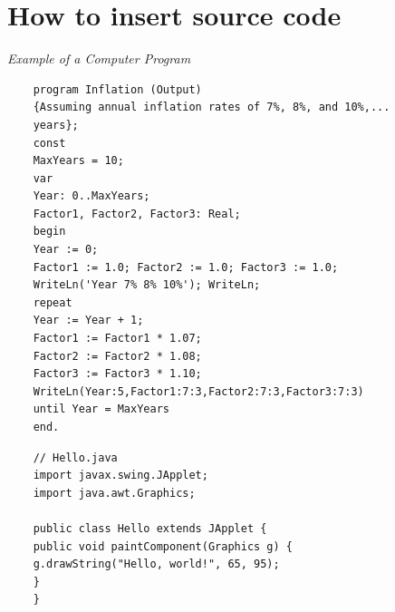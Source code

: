 \chapter{How to insert source code}

\noindent
{\it Example of a Computer Program}
\begin{verbatim}
    program Inflation (Output)
    {Assuming annual inflation rates of 7%, 8%, and 10%,...
    years};
    const
    MaxYears = 10;
    var
    Year: 0..MaxYears;
    Factor1, Factor2, Factor3: Real;
    begin
    Year := 0;
    Factor1 := 1.0; Factor2 := 1.0; Factor3 := 1.0;
    WriteLn('Year 7% 8% 10%'); WriteLn;
    repeat
    Year := Year + 1;
    Factor1 := Factor1 * 1.07;
    Factor2 := Factor2 * 1.08;
    Factor3 := Factor3 * 1.10;
    WriteLn(Year:5,Factor1:7:3,Factor2:7:3,Factor3:7:3)
    until Year = MaxYears
    end.
\end{verbatim}
%
\noindent
\begin{lstlisting}
    // Hello.java
    import javax.swing.JApplet;
    import java.awt.Graphics;

    public class Hello extends JApplet {
    public void paintComponent(Graphics g) {
    g.drawString("Hello, world!", 65, 95);
    }
    }
\end{lstlisting}

